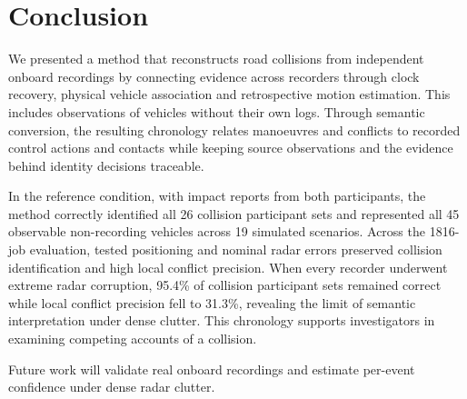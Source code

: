 \section{Conclusion}
\label{sec:conclusion}

We presented a method that reconstructs road collisions from independent
onboard recordings by connecting evidence across recorders through clock
recovery, physical vehicle association and retrospective motion
estimation. This includes observations of vehicles without their own
logs. Through semantic conversion, the resulting chronology relates
manoeuvres and conflicts to recorded control actions and contacts while
keeping source observations and the evidence behind identity decisions
traceable.

In the reference condition, with impact reports from both participants,
the method correctly identified all 26 collision participant sets and
represented all 45 observable
non-recording vehicles across 19 simulated scenarios. Across the
1816-job evaluation, tested positioning and nominal radar errors
preserved collision identification and high local conflict precision.
When every recorder underwent extreme radar corruption, 95.4\% of
collision participant sets remained correct while local conflict
precision fell to 31.3\%, revealing the limit of semantic interpretation
under dense clutter. This chronology supports investigators in
examining competing accounts of a collision.

Future work will validate real onboard recordings and estimate
per-event confidence under dense radar clutter.
